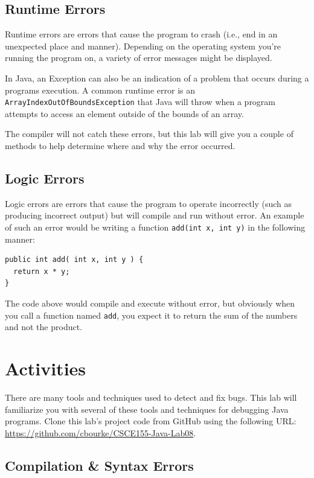 \documentclass[12pt]{scrartcl}
\begin{document}
\subsection*{Runtime Errors}

Runtime errors are errors that cause the program to crash (i.e., end in 
an unexpected place and manner).  Depending on the operating system 
you're running the program on, a variety of error messages might be 
displayed.  

In Java, an Exception can also be an indication of a problem that occurs 
during a programs execution.  A common runtime error is an 
\texttt{ArrayIndexOutOfBoundsException} that Java will throw 
when a program attempts to access an element outside of the bounds 
of an array.

The compiler will not catch these errors, but this lab will give you a couple 
of methods to help determine where and why the error occurred.  

\subsection*{Logic Errors}

Logic errors are errors that cause the program to operate incorrectly (such 
as producing incorrect output) but will compile and run without error.  An 
example of such an error would be writing a function \texttt{add(int x, int y)} 
in the following manner:

\begin{verbatim}
public int add( int x, int y ) {
  return x * y;
}
\end{verbatim}

The code above would compile and execute without error, but obviously 
when you call a function named \texttt{add}, you expect it to return the sum 
of the numbers and not the product.  

\section{Activities}

There are many tools and techniques used to detect and fix bugs.  This lab 
will familiarize you with several of these tools and techniques for debugging 
Java programs.  Clone this lab's project code from GitHub using the following
URL: \url{https://github.com/cbourke/CSCE155-Java-Lab08}.

\subsection{Compilation \& Syntax Errors}
\end{document}
